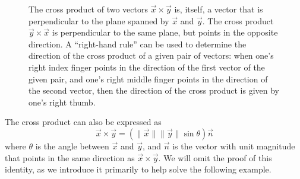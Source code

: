 \documentclass[../book.tex]{subfiles}
\begin{document}
\begin{figure}[htbp]
  \centering
  \caption{The cross product of two vectors \(\vec{x}\times \vec{y}\) is, itself, a vector that is perpendicular to the plane spanned by \(\vec{x}\) and \(\vec{y}\). The cross product \(\vec{y}\times\vec{x}\) is perpendicular to the same plane, but points in the opposite direction. A ``right-hand rule'' can be used to determine the direction of the cross product of a given pair of vectors: when one's right index finger points in the direction of the first vector of the given pair, and one's right middle finger points in the direction of the second vector, then the direction of the cross product is given by one's right thumb.}
  \label{fig:xprod}
\end{figure}

The cross product can also be expressed as
\begin{equation}\label{eq:vec-15}
\vec{x} \times \vec{y} = \left( \| \vec{x}\| \| \vec{y}\|  \sin \theta  \right) \vec{n}
\end{equation}
where \(\theta\) is the angle between \(\vec{x}\) and \(\vec{y}\), and \(\vec{n}\) is the vector with unit magnitude that points in the same direction as \(\vec{x}\times\vec{y}\). We will omit the proof of this identity, as we introduce it primarily to help solve the following example.
\end{document}
